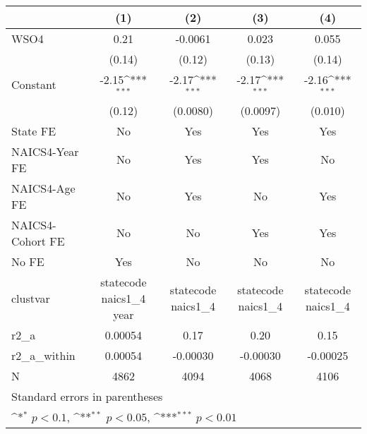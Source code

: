 {
\def\sym#1{\ifmmode^{#1}\else\(^{#1}\)\fi}
\begin{tabular}{l*{4}{c}}
\hline\hline
                    &\multicolumn{1}{c}{(1)}         &\multicolumn{1}{c}{(2)}         &\multicolumn{1}{c}{(3)}         &\multicolumn{1}{c}{(4)}         \\
\hline
WSO4                &        0.21         &     -0.0061         &       0.023         &       0.055         \\
                    &      (0.14)         &      (0.12)         &      (0.13)         &      (0.14)         \\
[1em]
Constant            &       -2.15\sym{***}&       -2.17\sym{***}&       -2.17\sym{***}&       -2.16\sym{***}\\
                    &      (0.12)         &    (0.0080)         &    (0.0097)         &     (0.010)         \\
[1em]
State FE            &          No         &         Yes         &         Yes         &         Yes         \\
[1em]
NAICS4-Year FE      &          No         &         Yes         &         Yes         &          No         \\
[1em]
NAICS4-Age FE       &          No         &         Yes         &          No         &         Yes         \\
[1em]
NAICS4-Cohort FE    &          No         &          No         &         Yes         &         Yes         \\
[1em]
No FE               &         Yes         &          No         &          No         &          No         \\
\hline
clustvar            &statecode naics1\_4 year         &statecode naics1\_4         &statecode naics1\_4         &statecode naics1\_4         \\
r2\_a                &     0.00054         &        0.17         &        0.20         &        0.15         \\
r2\_a\_within         &     0.00054         &    -0.00030         &    -0.00030         &    -0.00025         \\
N                   &        4862         &        4094         &        4068         &        4106         \\
\hline\hline
\multicolumn{5}{l}{\footnotesize Standard errors in parentheses}\\
\multicolumn{5}{l}{\footnotesize \sym{*} \(p<0.1\), \sym{**} \(p<0.05\), \sym{***} \(p<0.01\)}\\
\end{tabular}
}
